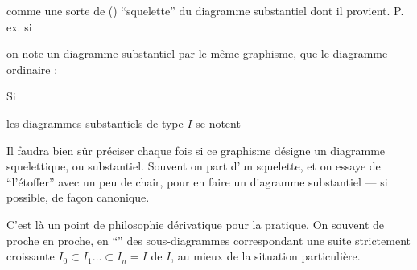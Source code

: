 comme une sorte de () ``squelette'' du diagramme substantiel dont il provient. P. ex. si


on note un diagramme substantiel  par le même graphisme, que le  diagramme ordinaire :


Si


les diagrammes substantiels de type $I$ se notent


Il faudra bien sûr préciser chaque fois si ce graphisme désigne un diagramme squelettique, ou substantiel. Souvent on part d'un squelette, et on essaye de ``l'étoffer'' avec un peu de chair, pour en faire un diagramme substantiel --- si possible, de façon canonique.

C'est là un point de philosophie dérivatique  pour la pratique. On  souvent de proche en proche, en ``'' des sous-diagrammes correspondant  une suite strictement croissante $I_0\subset I_1\ldots\subset I_n=I$ de $I$, au mieux de la situation particulière.
